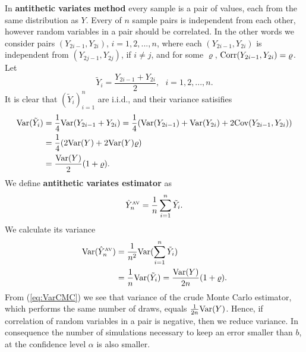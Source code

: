 \documentclass[a4paper,12pt, oneside]{book}
\theoremstyle{definition}
\theoremstyle{remark}
\def\Var{{\rm Var}}
\def\Cov{{\hbox{Cov}}}
\def\Corr{{\hbox{Corr}}}
\def\AV[#1]{\hat{Y}^{\hbox{\tiny AV}}_{#1}}
\begin{document}
In \textbf{antithetic variates method} every sample is a pair of values, each from the same distribution as $Y$. Every of $n$ sample pairs is independent from each other, however random variables in a pair should be correlated. In the other words we consider pairs $(Y_{2i-1}, Y_{2i})$, $i=1,2,...,n$,
where each $(Y_{2i-1}, Y_{2i})$ is independent from $(Y_{2j-1}, Y_{2j})$, if $i \neq j$, and for some $\varrho$, $\Corr(Y_{2i-1}, Y_{2i}) = \varrho$. Let
\begin{equation*}
 \tilde{Y}_i = \frac{Y_{2i-1} + Y_{2i}}{2},\ \ \ i = 1,2,...,n.
\end{equation*}
It is clear that $(\tilde{Y}_i)_{i=1}^n$ are i.i.d., and their variance satisifies
\begin{equation*}
 \begin{split}
 \Var(\tilde{Y}_i) &= \dfrac{1}{4} \Var( Y_{2i-1} + Y_{2i} ) = \dfrac{1}{4} (\Var(Y_{2i-1}) + \Var(Y_{2i}) + 2\Cov(Y_{2i-1}, Y_{2i})) \\
 &= \dfrac{1}{4} (2\Var(Y) + 2\Var(Y)\varrho) \\
 &= \dfrac{\Var(Y)}{2} (1 + \varrho).
 \end{split}
\end{equation*}
We define \textbf{antithetic variates estimator} as
\begin{equation*}
 \AV[n] = \frac{1}{n}\sum\limits_{i=1}^n \tilde{Y}_i.
\end{equation*}
We calculate its variance
\begin{equation}
 \label{eq:VarAV}
 \begin{split}
 \Var(\AV[n]) &= \frac{1}{n^2} \Var(\sum\limits_{i=1}^n \tilde{Y}_i) \\
   &= \frac{1}{n} \Var(\tilde{Y}_i) = \dfrac{\Var(Y)}{2n} (1 + \varrho).
 \end{split}
\end{equation}
From (\ref{eq:VarCMC}) we see that variance of the crude Monte Carlo estimator, which performs the same number of draws, equals $\frac{1}{2n}\Var(Y)$. Hence, if correlation of random variables in a pair is negative, then we reduce variance. In consequence the number of simulations necessary to keep an error smaller than $b$, at the confidence level $\alpha$ is also smaller.
\end{document}
